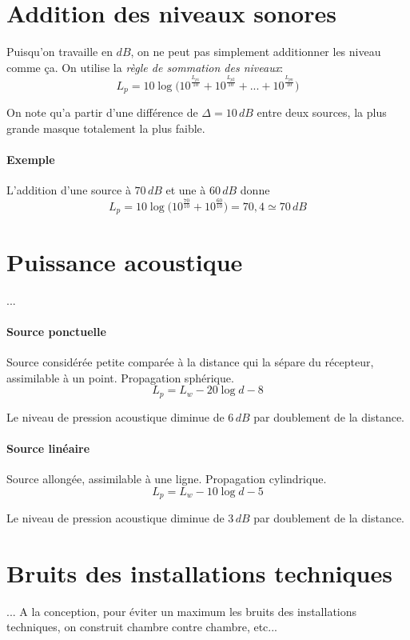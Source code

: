 \documentclass[11pt]{report}
\begin{document}
\section{Addition des niveaux sonores}
Puisqu'on travaille en $dB$, on ne peut pas simplement additionner les niveau comme ça. On utilise la \textit{règle de sommation des niveaux}:
$$L_p = 10\log \Big( 10^{\frac{L_{p1}}{10}}+10^{\frac{L_{p2}}{10}}+...+10^{\frac{L_{pn}}{10}} \Big)$$

On note qu'a partir d'une différence de $\Delta=10\,dB$ entre deux sources, la plus grande masque totalement la plus faible.


\paragraph{Exemple } L'addition d'une source à $70\,dB$ et une à $60\,dB$ donne
$$L_p = 10\log \Big( 10^{\frac{70}{10}}+10^{\frac{60}{10}}\Big)=70,4 \simeq 70 \,dB$$


\section{Puissance acoustique}
...
\paragraph{Source ponctuelle} Source considérée petite comparée à la distance qui la sépare du récepteur, assimilable à un point. Propagation sphérique.
$$L_p=L_w-20 \log d - 8$$

Le niveau de pression acoustique diminue de $6\,dB$ par doublement de la distance.

\paragraph{Source linéaire} Source allongée, assimilable à une ligne. Propagation cylindrique.
$$L_p=L_w-10 \log d - 5$$

Le niveau de pression acoustique diminue de $3\,dB$ par doublement de la distance.




\section{Bruits des installations techniques}
...
A la conception, pour éviter un maximum les bruits des installations techniques, on construit chambre contre chambre, etc...\\
\end{document}
